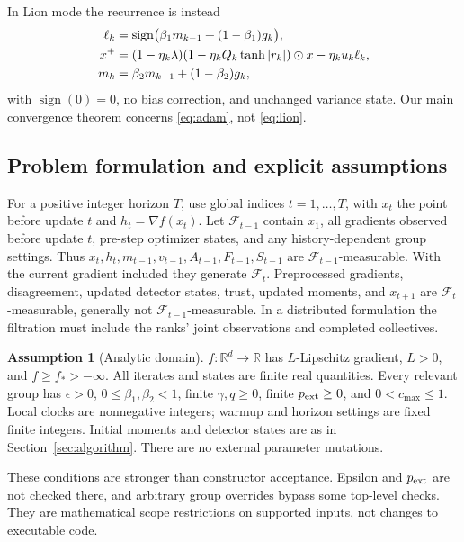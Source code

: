 \documentclass[11pt,a4paper]{article}
\theoremstyle{definition}
\newtheorem{assumption}[theorem]{Assumption}
\theoremstyle{remark}
\newcommand{\R}{\mathbb R}
\newcommand{\sgn}{\operatorname{sign}}
\begin{document}
In Lion mode the recurrence is instead
\begin{align}
 \ell_k&=\sgn\bigl(\beta_1m_{k-1}+(1-\beta_1)g_k\bigr),\label{eq:lion}\\
 x^+&=(1-\eta_k\lambda)(1-\eta_kQ_k\tanh|r_k|)\odot x-\eta_k u_k\ell_k,\notag\\
 m_k&=\beta_2m_{k-1}+(1-\beta_2)g_k,\notag
\end{align}
with $\sgn(0)=0$, no bias correction, and unchanged variance state. Our main
convergence theorem concerns \eqref{eq:adam}, not \eqref{eq:lion}.

\subsection{Problem formulation and explicit assumptions}\label{sec:assumptions}
For a positive integer horizon $T$, use global indices $t=1,\ldots,T$, with $x_t$ the point before update $t$ and
$h_t=\nabla f(x_t)$. Let $\mathcal F_{t-1}$ contain $x_1$, all gradients observed
before update $t$, pre-step optimizer states, and any history-dependent group
settings. Thus $x_t,h_t,m_{t-1},v_{t-1},A_{t-1},F_{t-1},S_{t-1}$ are
$\mathcal F_{t-1}$-measurable. With the current gradient included they generate
$\mathcal F_t$. Preprocessed gradients, disagreement, updated detector states,
trust, updated moments, and $x_{t+1}$ are $\mathcal F_t$-measurable, generally
not $\mathcal F_{t-1}$-measurable. In a distributed formulation the filtration
must include the ranks' joint observations and completed collectives.

\begin{assumption}[Analytic domain]\label{ass:domain}
$f:\R^d\to\R$ has $L$-Lipschitz gradient, $L>0$, and $f\ge f_*>-\infty$.
All iterates and states are finite real quantities. Every relevant group has
$\epsilon>0$, $0\le\beta_1,\beta_2<1$, finite $\gamma,q\ge0$, finite
$p_{\rm ext}\ge0$, and $0<c_{\max}\le1$. Local clocks are nonnegative
integers; warmup and horizon settings are fixed finite integers. Initial moments and detector states are as in
Section~\ref{sec:algorithm}. There are no external parameter mutations.
\end{assumption}
These conditions are stronger than constructor acceptance. Epsilon and
$p_{\rm ext}$ are not checked there, and arbitrary group overrides bypass
some top-level checks. They are mathematical scope restrictions on supported
inputs, not changes to executable code.
\end{document}
